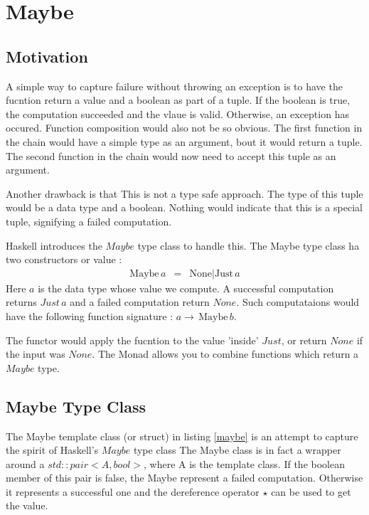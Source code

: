 \documentclass[12pt,fleqn]{article}
\begin{document}
%
%
\section{Maybe}
%

%
\subsection{Motivation}
%
%

A simple way to capture failure without throwing an exception is to have the fucntion return a value and a boolean as part of a tuple.
If the boolean is true, the computation succeeded and the vlaue is valid. Otherwise, an exception has occured.
Function composition would also not be so obvious. The first function in the chain would have a simple type as an argument, bout it would return a tuple.
The second function in the chain would now need to accept this tuple as an argument.

Another drawback is that This is not a type safe approach.
The type of this tuple would be a data type and a boolean. Nothing would indicate that this is a special tuple, signifying a failed computation.

Haskell introduces the $Maybe$ type class to handle this.
The Maybe type class ha two constructors or value :
%
\begin{eqnarray*}
\mbox{Maybe}\, a &=& \mbox{None} | \mbox{Just} \, a
\end{eqnarray*}
%
Here $a$ is the data type whose value we compute.
A successful computation returns $Just \, a$ and a failed computation return $None$.
Such computataions would have the following function signature : $ a \rightarrow \, \mbox{Maybe}\, b$.

 
The functor would apply the fucntion to the value 'inside' $Just$, or return $None$ if the input was $None$.
The Monad allows you to combine functions which return a $Maybe$ type.

%
\subsection{Maybe Type Class}
%
%
The Maybe template class (or struct) in listing \ref{maybe} is an attempt to capture the spirit of Haskell's $Maybe$ type class
The Maybe class is in fact a wrapper around a $std::pair<A,bool>$, where A is the template class.
If the boolean member of this pair is false, the Maybe represent a failed computation.
Otherwise it represents a successful one and the dereference operator $\star$ can be used to get the value.
\end{document}

